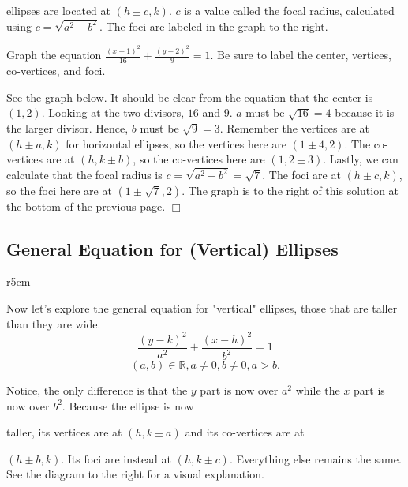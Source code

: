 \documentclass[lang=en,11pt]{elegantbook}
\begin{document}
\noindent ellipses are located at $(h \pm c,k)$.  $c$ is a value called the focal radius, calculated using $c=\sqrt{a^2-b^2}$.  The foci are labeled in the graph to the right.

\begin{example}
Graph the equation $\frac{(x-1)^2}{16} + \frac{(y-2)^2}{9} = 1$.  Be sure to label the center, vertices, co-vertices, and foci.
\end{example}
\begin{solution}
See the graph below.
It should be clear from the equation that the center is $(1,2)$.  Looking at the two divisors, $16$ and $9$.  $a$ must be $\sqrt{16}=4$ because it is the larger divisor.  Hence, $b$ must be $\sqrt{9}=3$.  Remember the vertices are at $(h\pm a,k)$ for horizontal ellipses, so the vertices here are $(1 \pm 4,2)$.  The co-vertices are at $(h, k \pm b)$, so the co-vertices here are $(1,2 \pm 3)$.  Lastly, we can calculate that the focal radius is $c=\sqrt{a^2-b^2}=\sqrt{7}$.  The foci are at $(h \pm c ,k)$, so the foci here are at $(1 \pm \sqrt7, 2)$.  The graph is to the right of this solution at the bottom of the previous page. $\Box$
\end{solution}

\subsection{General Equation for (Vertical) Ellipses}

\begin{wrapfigure}{r}{5cm}
\end{wrapfigure}

\noindent Now let's explore the general equation for "vertical" ellipses, those that are taller than they are wide.
$$ \frac{(y-k)^2}{a^2} + \frac{(x-h)^2}{b^2} = 1$$$$(a,b)\in\mathbb{R},a\neq 0,b\neq 0,a>b.$$

\noindent Notice, the only difference is that the $y$ part is now over $a^2$ while the $x$ part is now over $b^2$.  Because the ellipse is now 

\noindent taller, its vertices are at $(h,k \pm a)$ and its co-vertices are at

\noindent $(h \pm b, k)$.  Its foci are instead at $ (h,k \pm c) $.  Everything else remains the same.  See the diagram to the right for a visual explanation.
\end{document}
